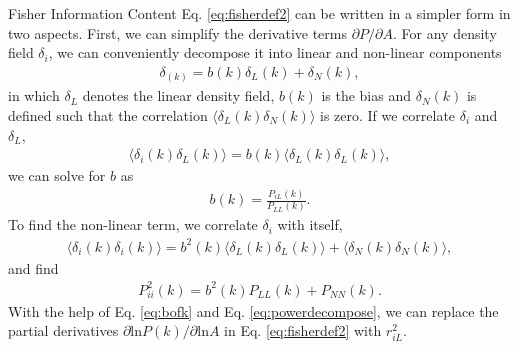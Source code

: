 \begin{section}{Fisher Information Content}
  Eq. \ref{eq:fisherdef2} can be written in a simpler
  form in two aspects.   First, we can simplify the derivative terms
  $\partial P/\partial A$.  For any density field $\delta_i$, we can
  conveniently decompose it into linear and non-linear components
  \begin{align}
    \delta_(k) = b (k) \delta _L (k) + \delta_{N}(k),
    \label{eq:decompose}
  \end{align}
  in which $\delta_L$ denotes the linear density field, $b(k)$ is the
  bias and $\delta_{N}(k)$ is defined such that the correlation
  $\langle \delta_L(k)\delta_{N}(k) \rangle$ is zero.  If we correlate
  $\delta_i$ and $\delta_L$,
  \begin{align}
    \langle \delta_i(k)\delta_L(k) \rangle = b(k) \langle \delta_L(k)\delta_L(k) \rangle,
    \label{eq:correlating}
  \end{align} 
  we can solve for $b$ as
  \begin{align}
    b (k) = \frac{P _{iL}(k)}{P_{LL}(k)}.
    \label{eq:bofk}
  \end{align}
  To find the non-linear term, we correlate $\delta_i$ with itself,
  \begin{align}
    \langle \delta_i(k) \delta_i(k) \rangle = 
    b^2(k) \langle \delta_L(k) \delta_L(k) \rangle + \langle \delta_{N}(k)\delta_{N}(k) \rangle,
  \end{align}
  and find
  \begin{align}
    P_{ii}^2 (k) = b^2(k) P_{LL} (k) + P_{NN} (k).
    \label{eq:powerdecompose}
  \end{align}
  With the help of Eq. \ref{eq:bofk} and Eq. \ref{eq:powerdecompose},
  we can replace the partial derivatives
  $\partial \mathrm{ln} P(k) / \partial \mathrm{ln} A$ in
  Eq. \ref{eq:fisherdef2} with $r^2_{iL}$.


\end{section}
